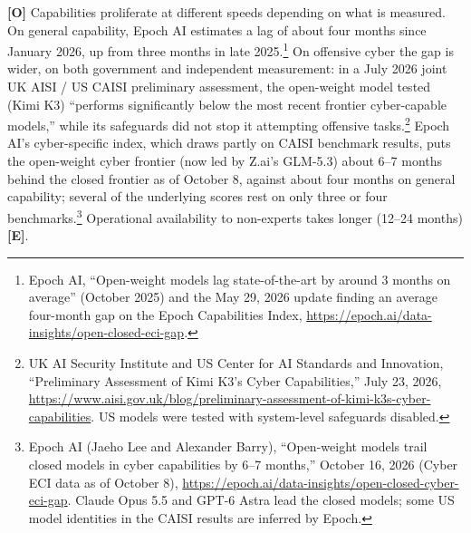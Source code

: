 \documentclass[11pt,letterpaper]{article}
\begin{document}
\textbf{[O]} Capabilities proliferate at different speeds depending on what is measured. On general capability, Epoch AI estimates a lag of about four months since January 2026, up from three months in late 2025.\footnote{Epoch AI, ``Open-weight models lag state-of-the-art by around 3 months on average'' (October 2025) and the May 29, 2026 update finding an average four-month gap on the Epoch Capabilities Index, \url{https://epoch.ai/data-insights/open-closed-eci-gap}.} On offensive cyber the gap is wider, on both government and independent measurement: in a July 2026 joint UK AISI / US CAISI preliminary assessment, the open-weight model tested (Kimi K3) ``performs significantly below the most recent frontier cyber-capable models,'' while its safeguards did not stop it attempting offensive tasks.\footnote{UK AI Security Institute and US Center for AI Standards and Innovation, ``Preliminary Assessment of Kimi K3's Cyber Capabilities,'' July 23, 2026, \url{https://www.aisi.gov.uk/blog/preliminary-assessment-of-kimi-k3s-cyber-capabilities}. US models were tested with system-level safeguards disabled.} Epoch AI's cyber-specific index, which draws partly on CAISI benchmark results, puts the open-weight cyber frontier (now led by Z.ai's GLM-5.3) about 6--7 months behind the closed frontier as of October 8, against about four months on general capability; several of the underlying scores rest on only three or four benchmarks.\footnote{Epoch AI (Jaeho Lee and Alexander Barry), ``Open-weight models trail closed models in cyber capabilities by 6--7 months,'' October 16, 2026 (Cyber ECI data as of October 8), \url{https://epoch.ai/data-insights/open-closed-cyber-eci-gap}. Claude Opus 5.5 and GPT-6 Astra lead the closed models; some US model identities in the CAISI results are inferred by Epoch.} Operational availability to non-experts takes longer (12--24 months) \textbf{[E]}.
\end{document}
